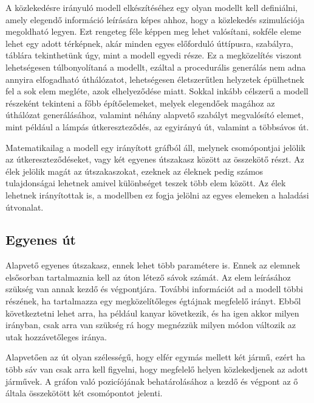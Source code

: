 

A közlekedésre irányuló modell elkészítéséhez egy olyan modellt kell definiálni, amely elegendő információ leírására képes ahhoz, hogy a közlekedés szimulációja megoldható legyen.
Ezt rengeteg féle képpen meg lehet valósítani, sokféle eleme lehet egy adott térképnek, akár minden egyes előforduló úttípusra, 
szabályra, táblára tekinthetünk úgy, mint a modell egyedi része. Ez a megközelítés viszont lehetségesen túlbonyolítaná a modellt, ezáltal a procedurális generálás
nem adna annyira elfogadható úthálózatot, lehetségesen életszerűtlen helyzetek épülhetnek fel a sok elem megléte, azok elhelyeződése miatt. Sokkal inkább célszerű a 
modell részeként tekinteni a főbb építőelemeket, melyek elegendőek magához az úthálózat generálásához, valamint néhány alapvető szabályt megvalósító elemet, mint például 
a lámpás útkereszteződés, az egyirányú út, valamint a többsávos út.


Matematikailag a modell egy irányított gráfból áll, melynek csomópontjai jelölik az útkereszteződéseket, vagy két egyenes útszakasz között az összekötő részt. Az élek jelölik magát az útszakaszokat, ezeknek az éleknek pedig számos tulajdonságai lehetnek amivel különbséget teszek több elem között. Az élek lehetnek irányítottak is, a modellben ez fogja jelölni az egyes elemeken a haladási útvonalat.

\subsection{Egyenes út}

Alapvető egyenes útszakasz, ennek lehet több paramétere is. Ennek az elemnek elsősorban tartalmaznia kell az úton létező sávok számát.
Az elem leírásához szükség van annak kezdő és végpontjára. További információt ad a modell többi részének, ha tartalmazza egy megközelítőleges égtájnak megfelelő irányt. Ebből következtetni lehet arra, ha például kanyar következik, és ha igen akkor milyen irányban, csak arra van szükség rá hogy megnézzük milyen módon változik az utak hozzávetőleges iránya.

Alapvetően az út olyan szélességű, hogy elfér egymás mellett két jármű, ezért ha több sáv van csak arra kell figyelni, hogy megfelelő helyen közlekedjenek az adott járművek. A gráfon való pozicíójának behatárolásához a kezdő és végpont az ő általa összekötött két csomópontot jelenti.

